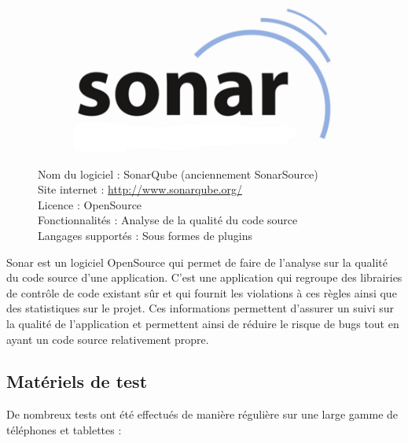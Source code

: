 \documentclass{report}
\begin{document}
\begin{figure}[h]
\begin{figure}
\includegraphics{images/sonar_logo}
\end{figure}
\noindent
Nom du logiciel : SonarQube (anciennement SonarSource)\\
Site internet : \url{http://www.sonarqube.org/}\\
Licence : OpenSource\\
Fonctionnalités : Analyse de la qualité du code source\\
Langages supportés : Sous formes de plugins\\
\bigskip
\end{figure}
\noindent
Sonar est un logiciel OpenSource qui permet de faire de l’analyse sur
la qualité du code source d’une application. C’est une application qui
regroupe des librairies de contrôle de code existant sûr et qui fournit
les violations à ces règles ainsi que des statistiques sur le projet.
Ces informations permettent d’assurer un suivi sur la qualité de
l’application et permettent ainsi de réduire le risque de bugs tout en
ayant un code source relativement propre.

\subsection{Matériels de test}
\bigskip


De nombreux tests ont été effectués de manière régulière sur une large
gamme de téléphones et tablettes :
\end{document}
